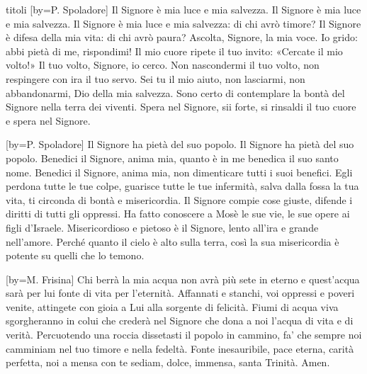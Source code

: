 \begin{songs}{titoli}
[by={P. Spoladore}]
\beginchorus
Il Signore è mia luce e mia salvezza.
Il Signore è mia luce e mia salvezza. 
\endchorus
\beginverse
Il Signore è mia luce e mia salvezza:
di chi avrò timore?
Il Signore è difesa della mia vita:
di chi avrò paura?
\endverse
\beginverse
Ascolta, Signore, la mia voce.
Io grido: abbi pietà di me, rispondimi!
Il mio cuore ripete il tuo invito:
«Cercate il mio volto!» Il tuo volto, Signore, io cerco.
\endverse
\beginverse
Non nascondermi il tuo volto,
non respingere con ira il tuo servo.
Sei tu il mio aiuto, non lasciarmi,
non abbandonarmi, Dio della mia salvezza.
\endverse
\beginverse
Sono certo di contemplare la bontà del Signore
nella terra dei viventi.
Spera nel Signore, sii forte,
si rinsaldi il tuo cuore e spera nel Signore.
\endverse
\endsong

[by={P. Spoladore}]
\beginchorus
Il Signore ha pietà del suo popolo.
Il Signore ha pietà del suo popolo. 
\endchorus
\beginverse
Benedici il Signore, anima mia,
quanto è in me benedica il suo santo nome.
Benedici il Signore, anima mia,
non dimenticare tutti i suoi benefici.
\endverse
\beginverse
Egli perdona tutte le tue colpe,
guarisce tutte le tue infermità,
salva dalla fossa la tua vita,
ti circonda di bontà e misericordia.
\endverse
\beginverse
Il Signore compie cose giuste,
difende i diritti di tutti gli oppressi.
Ha fatto conoscere a Mosè le sue vie,
le sue opere ai figli d'Israele.
\endverse
\beginverse
Misericordioso e pietoso è il Signore,
lento all'ira e grande nell'amore.
Perché quanto il cielo è alto sulla terra,
così la sua misericordia è potente su quelli che lo temono.
\endverse
\endsong

[by={M. Frisina}]
\beginchorus
Chi berrà la mia acqua
non avrà più sete in eterno
e quest'acqua sarà per lui
fonte di vita per l'eternità.
\endchorus
\beginverse
Affannati e stanchi,
voi oppressi e poveri venite,
attingete con gioia a Lui
alla sorgente di felicità.
\endverse
\beginverse
Fiumi di acqua viva
sgorgheranno in colui che crederà
nel Signore che dona a noi
l'acqua di vita e di verità.
\endverse
\beginverse
Percuotendo una roccia
dissetasti il popolo in cammino,
fa' che sempre noi camminiam
nel tuo timore e nella fedeltà.
\endverse
\beginverse
Fonte inesauribile,
pace eterna, carità perfetta,
noi a mensa con te sediam,
dolce, immensa, santa Trinità.
\endverse
\beginverse*
Amen.
\endverse
\endsong


\end{songs}
